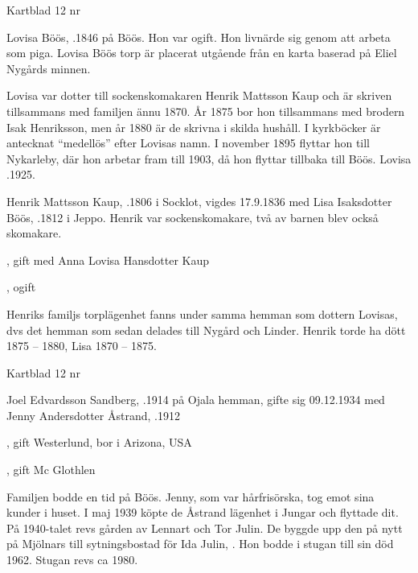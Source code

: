 Kartblad 12   nr 

Lovisa Böös, .1846 på Böös. Hon var ogift. Hon livnärde sig genom att arbeta som piga. Lovisa Böös torp är placerat utgående från en karta baserad på Eliel Nygårds minnen.

Lovisa var dotter till sockenskomakaren Henrik Mattsson Kaup och är skriven tillsammans med familjen ännu 1870. År 1875 bor hon tillsammans med brodern Isak Henriksson, men år 1880 är de skrivna i skilda hushåll. I kyrkböcker är antecknat ``medellös'' efter Lovisas namn. I november 1895 flyttar hon till Nykarleby, där hon arbetar fram till 1903, då hon flyttar tillbaka till Böös. Lovisa .1925.


Henrik Mattsson Kaup, .1806 i Socklot, vigdes 17.9.1836 med Lisa Isaksdotter Böös, .1812 i Jeppo. Henrik var sockenskomakare, två av barnen blev också skomakare.
\begin{jhchildren}
  \item {}
  \item {}
  \item {}, gift med Anna Lovisa Hansdotter Kaup
  \item {}, ogift
  \item {}
  \item {}
  \item {}
  \item {}
\end{jhchildren}
Henriks familjs torplägenhet fanns under samma hemman som dottern Lovisas, dvs det hemman som sedan delades till Nygård och Linder. Henrik torde ha dött 1875 – 1880, Lisa 1870 – 1875.


Kartblad 12   nr 

Joel Edvardsson Sandberg, .1914 på Ojala hemman, gifte sig 09.12.1934 med Jenny Andersdotter Åstrand, .1912
\begin{jhchildren}
  \item {}, gift Westerlund, bor i Arizona, USA
  \item {}, gift Mc Glothlen
\end{jhchildren}
Familjen bodde en tid på Böös. Jenny, som var hårfrisörska, tog emot sina kunder i huset. I maj 1939 köpte de Åstrand lägenhet i Jungar och flyttade dit. På 1940-talet revs gården av Lennart och Tor Julin. De byggde upp den på nytt på Mjölnars till sytningsbostad för Ida Julin, . Hon bodde i stugan till sin död 1962. Stugan revs ca 1980.


